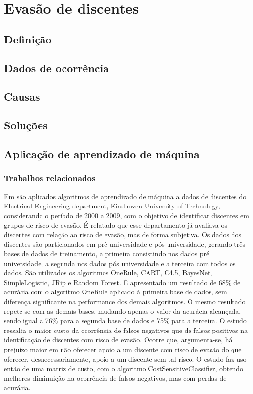 \chapter{Evasão de discentes}

\section{Definição}

\section{Dados de ocorrência}

\section{Causas}

\section{Soluções}

\section{Aplicação de aprendizado de máquina}

\subsection*{Trabalhos relacionados}



Em \cite{Predicting_Students} são aplicados algoritmos de aprendizado de máquina a dados de discentes do Electrical Engineering department, Eindhoven University of Technology, considerando o período de 2000 a 2009, com o objetivo de identificar discentes em grupos de risco de evasão. É relatado que esse departamento já avaliava os discentes com relação ao risco de evasão, mas de forma subjetiva. Os dados dos discentes são particionados em pré universidade e pós universidade, gerando três bases de dados de treinamento, a primeira consistindo nos dados pré universidade, a segunda nos dados pós universidade e a terceira com todos os dados. São utilizados os algoritmos OneRule, CART, C4.5, BayesNet, SimpleLogistic, JRip e Random Forest. É apresentado um resultado de 68\% de acurácia com o algoritmo OneRule aplicado à primeira base de dados, sem diferença significante na performance dos demais algoritmos. O mesmo resultado repete-se com as demais bases, mudando apenas o valor da acurácia alcançada, sendo igual a 76\% para a segunda base de dados e 75\% para a terceira. O estudo ressalta o maior custo da ocorrência de falsos negativos que de falsos positivos na identificação de discentes com risco de evasão. Ocorre que, argumenta-se, há prejuízo maior em não oferecer apoio a um discente com risco de evasão do que oferecer, desnecessariamente, apoio a um discente sem tal risco. O estudo faz uso então de uma matriz de custo, com o algoritmo CostSensitiveClassifier, obtendo melhores diminuição na ocorrência de falsos negativos, mas com perdas de acurácia. 

